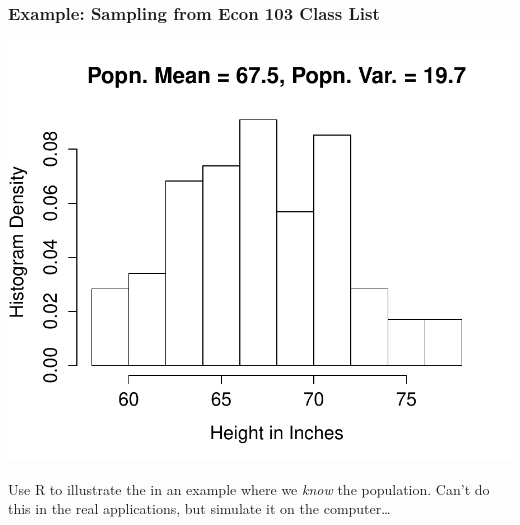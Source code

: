 \begin{frame}
\frametitle{Example: Sampling from Econ 103 Class List}
\begin{center}
\includegraphics[scale = 0.4]{./images/height_hist}
\end{center}
\alert{Use R to illustrate the in an example where we \emph{know} the population.  
Can't do this in the real applications, but simulate it on the computer\dots}
\end{frame}

